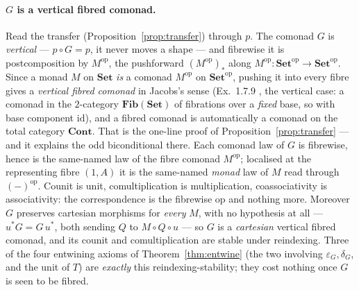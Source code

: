 \documentclass[11pt,a4paper]{book}
\newcommand{\Set}{\mathbf{Set}}
\newcommand{\Cont}{\mathbf{Cont}}
\newcommand{\op}{^{\mathrm{op}}}
\newcommand{\id}{\mathrm{id}}
\theoremstyle{plain}
\theoremstyle{definition}
\theoremstyle{remark}
\begin{document}
\paragraph{$G$ is a vertical fibred comonad.} Read the transfer (Proposition~\ref{prop:transfer}) through
$p$. The comonad $G$ is \emph{vertical} --- $p\circ G=p$, it never moves a shape --- and fibrewise it is
postcomposition by $M\op$, the pushforward $(M\op)_{*}$ along $M\op\colon\Set\op\to\Set\op$. Since a monad
$M$ on $\Set$ \emph{is} a comonad $M\op$ on $\Set\op$, pushing it into every fibre gives a \emph{vertical
fibred comonad} in Jacobs's sense (Ex.~1.7.9 \cite{Jacobs99}, the vertical case: a comonad in the
$2$-category $\mathbf{Fib}(\Set)$ of fibrations over a \emph{fixed} base, so with base component $\id$), and
a fibred comonad is automatically a comonad on the total category $\Cont$. That is the one-line proof of Proposition~\ref{prop:transfer} --- and it explains the odd
biconditional there. Each comonad law of $G$ is fibrewise, hence is the same-named law of the fibre comonad
$M\op$; localised at the representing fibre $(1,A)$ it is the same-named \emph{monad} law of $M$ read through
$(-)\op$. Counit is unit, comultiplication is multiplication, coassociativity is associativity: the
correspondence is the fibrewise op and nothing more. Moreover $G$ preserves cartesian morphisms for
\emph{every} $M$, with no hypothesis at all --- $u^{*}G=G\,u^{*}$, both sending $Q$ to $M\circ Q\circ u$ ---
so $G$ is a \emph{cartesian} vertical fibred comonad, and its counit and comultiplication are stable under
reindexing. Three of the four entwining axioms of Theorem~\ref{thm:entwine} (the two involving
$\varepsilon_{G},\delta_{G}$, and the unit of $T$) are \emph{exactly} this reindexing-stability; they cost
nothing once $G$ is seen to be fibred.
\end{document}
